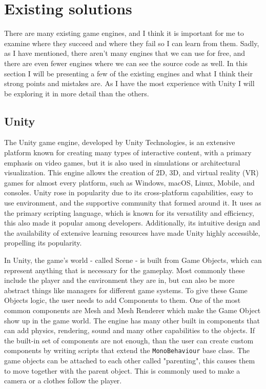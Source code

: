 \chapter{Existing solutions}\label{chapter:research}

There are many existing game engines, and I think it is important for me to examine where they succeed and where they fail so I can learn from them. Sadly, as I have mentioned, there aren't many engines that we can use for free, and there are even fewer engines where we can see the source code as well. In this section I will be presenting a few of the existing engines and what I think their strong points and mistakes are.
As I have the most experience with Unity I will be exploring it in more detail than the others.


\section{Unity}

The Unity game engine\cite{unity}, developed by Unity Technologies, is an extensive platform known for creating many types of interactive content, with a primary emphasis on video games, but it is also used in simulations or architectural visualization. This engine allows the creation of 2D, 3D, and virtual reality (VR) games for almost every platform, such as Windows, macOS, Linux, Mobile, and consoles. Unity rose in popularity due to its cross-platform capabilities, easy to use environment, and the supportive community that formed around it. It uses \Csh as the primary scripting language, which is known for its versatility and efficiency, this also made it popular among developers. Additionally, its intuitive design and the availability of extensive learning resources have made Unity highly accessible, propelling its popularity.

In Unity, the game's world - called Scene - is built from Game Objects, which can represent anything that is necessary for the gameplay. Most commonly these include the player and the environment they are in, but can also be more abstract things like managers for different game systems. To give these Game Objects logic, the user needs to add Components to them. One of the most common components are Mesh and Mesh Renderer which make the Game Object show up in the game world. The engine has many other built in components that can add physics, rendering, sound and many other capabilities to the objects. If the built-in set of components are not enough, than the user can create custom components by writing \Csh scripts that extend the \verb|MonoBehaviour| base class. The game objects can be attached to each other called "parenting", this causes them to move together with the parent object. This is commonly used to make a camera or a clothes follow the player.

